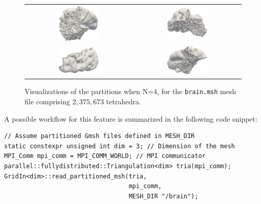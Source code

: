 \documentclass[a4paper,12pt]{article}
\begin{document}
\begin{figure}[htbp]
    \centering
    \begin{tabular}{cc}
        \includegraphics[width=0.4\textwidth]{brain_1_cropped.pdf} &
        \includegraphics[width=0.4\textwidth]{brain_2_cropped.pdf}   \\
        \includegraphics[width=0.4\textwidth]{brain_3_cropped.pdf} &
        \includegraphics[width=0.4\textwidth]{brain_4_cropped.pdf}   \\
    \end{tabular}
    \caption{Visualizations of the partitions when N=4, for the \texttt{brain.msh} mesh file comprising $2,375,673$ tetrahedra.}
    \label{fig:partitioned_meshes}
\end{figure}

A possible workflow for this feature is summarized in the following code snippet:
\begin{lstlisting}[caption=Creating a \texttt{p::f::T} object from partitioned Gmsh files, label={lst:gmsh_workflow}]
// Assume partitioned Gmsh files defined in MESH_DIR
static constexpr unsigned int dim = 3; // Dimension of the mesh
MPI_Comm mpi_comm = MPI_COMM_WORLD; // MPI communicator
parallel::fullydistributed::Triangulation<dim> tria(mpi_comm);
GridIn<dim>::read_partitioned_msh(tria,
                                  mpi_comm,
                                  MESH_DIR "/brain");
\end{lstlisting}
\end{document}
